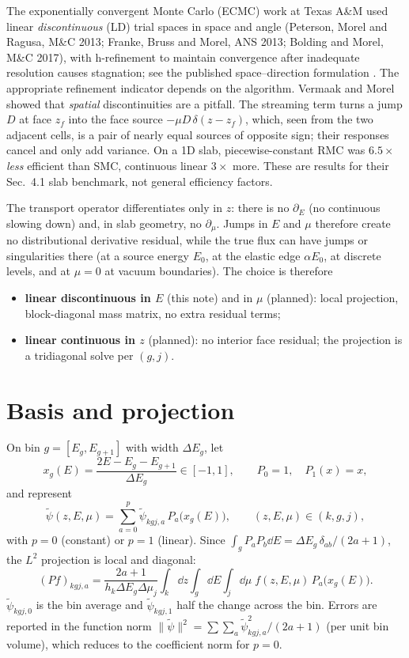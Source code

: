 \documentclass[11pt]{article}
\newcommand{\tpsi}{\tilde\psi}
\begin{document}
The exponentially convergent Monte Carlo (ECMC) work at Texas A\&M used linear
\emph{discontinuous} (LD) trial spaces in space and angle (Peterson, Morel and Ragusa,
M\&C 2013; Franke, Bruss and Morel, ANS 2013; Bolding and Morel, M\&C 2017), with
h-refinement to maintain convergence after inadequate resolution causes stagnation;
see the published space--direction formulation \cite{peterson}. The appropriate
refinement indicator depends on the algorithm. Vermaak and Morel
\cite{vermaak} showed that \emph{spatial}
discontinuities are a pitfall. The streaming term turns a jump $D$ at face $z_f$ into
the face source $-\mu D\,\delta(z-z_f)$, which, seen from the two adjacent cells, is a
pair of nearly equal sources of opposite sign; their responses cancel and only add
variance. On a 1D slab, piecewise-constant RMC was $6.5\times$ \emph{less} efficient
than SMC, continuous linear $3\times$ more. These are results for their
Sec.~4.1 slab benchmark, not general efficiency factors.

The transport operator differentiates only in $z$: there is no $\partial_E$ (no
continuous slowing down) and, in slab geometry, no $\partial_\mu$. Jumps in $E$ and
$\mu$ therefore create no distributional derivative residual, while the true flux can
have jumps or singularities there
(at a source energy $E_0$, at the elastic edge $\alpha E_0$, at discrete levels, and
at $\mu=0$ at vacuum boundaries). The choice is therefore
\begin{itemize}
  \item \textbf{linear discontinuous in $E$} (this note) and in $\mu$ (planned): local
  projection, block-diagonal mass matrix, no extra residual terms;
  \item \textbf{linear continuous in $z$} (planned): no interior face residual; the
  projection is a tridiagonal solve per $(g,j)$.
\end{itemize}

\section{Basis and projection}

On bin $g=[E_g,E_{g+1}]$ with width $\Delta E_g$, let
\begin{equation}
  x_g(E) = \frac{2E - E_g - E_{g+1}}{\Delta E_g}\in[-1,1],\qquad
  P_0 = 1,\quad P_1(x) = x ,
\end{equation}
and represent
\begin{equation}
  \tpsi(z,E,\mu) = \sum_{a=0}^{p} \tpsi_{kgj,a}\,P_a\big(x_g(E)\big),
  \qquad (z,E,\mu)\in(k,g,j),
\end{equation}
with $p=0$ (constant) or $p=1$ (linear). Since
$\int_g P_aP_b\dd E = \Delta E_g\,\delta_{ab}/(2a+1)$, the $L^2$ projection is local
and diagonal:
\begin{equation}
  (Pf)_{kgj,a} = \frac{2a+1}{h_k\Delta E_g\Delta\mu_j}
  \int_k\!\dd z\int_g\!\dd E\int_j\!\dd\mu\; f(z,E,\mu)\,P_a\big(x_g(E)\big).
  \label{eq:projection}
\end{equation}
$\tpsi_{kgj,0}$ is the bin average and $\tpsi_{kgj,1}$ half the change across the
bin. Errors are reported in the function norm
$\|\tpsi\|^2 = \sum\sum_a \tpsi_{kgj,a}^2/(2a+1)$ (per unit bin volume), which reduces
to the coefficient norm for $p=0$.
\end{document}
